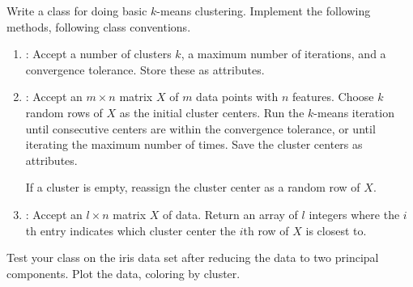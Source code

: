 %    	 
%   

\begin{problem}
Write a  class for doing basic $k$-means clustering.
Implement the following methods, following  class conventions.
\begin{enumerate}
\item {}: Accept a number of clusters $k$, a maximum number of iterations, and a convergence tolerance.
Store these as attributes.

\item {}: Accept an $m \times n$ matrix $X$ of $m$ data points with $n$ features.
Choose $k$ random rows of $X$ as the initial cluster centers.
Run the $k$-means iteration until consecutive centers are within the convergence tolerance, or until iterating the maximum number of times.
Save the cluster centers as attributes.

If a cluster is empty, reassign the cluster center as a random row of $X$.

\item {}: Accept an $l \times n$ matrix $X$ of data.
Return an array of $l$ integers where the $i$th entry indicates which cluster center the $i$th row of $X$ is closest to.
\end{enumerate}
%
Test your class on the iris data set after reducing the data to two principal components.
Plot the data, coloring by cluster.
\end{problem}

